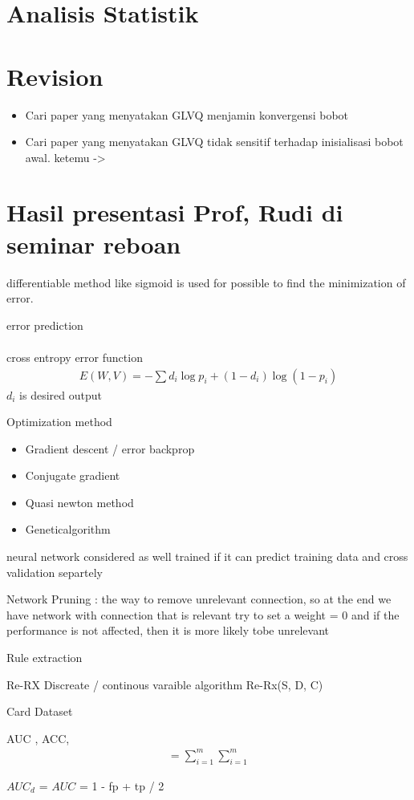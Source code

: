 \section{Analisis Statistik}




\newpage
\section{Revision}
\begin{itemize}
  \item Cari paper yang menyatakan GLVQ menjamin konvergensi bobot
  \item Cari paper yang menyatakan GLVQ tidak sensitif terhadap inisialisasi
  bobot awal. ketemu -> \cite{Sato-1999}
  
\end{itemize}

\newpage
\section{Hasil presentasi Prof, Rudi di seminar reboan}

differentiable method like sigmoid is used for possible to find the minimization
of error.

error prediction
\begin{align}
\end{align}

cross entropy error function
\begin{align}
	E(W,V) = - \sum d_i \log p_i + (1 - d_i) \log(1 - p_i)
\end{align}
$d_i$ is desired output

Optimization method
\begin{itemize}
  \item Gradient descent / error backprop
  \item Conjugate gradient
  \item Quasi newton method
  \item Geneticalgorithm
\end{itemize}

neural network considered as well trained if it can predict training data and
cross validation separtely


Network Pruning : the way to remove unrelevant connection, so at the end we have
network with connection that is relevant
try to set a weight = 0 and if the performance is not affected, then it is more
likely tobe unrelevant

Rule extraction

Re-RX
Discreate / continous varaible
algorithm Re-Rx(S, D, C)

Card Dataset


AUC , ACC, 
\begin{align}
=\sum_{i=1}^{m}\sum_{i=1}^{m}
\end{align}

$AUC_d$ = $AUC$ = 1 - fp + tp / 2

